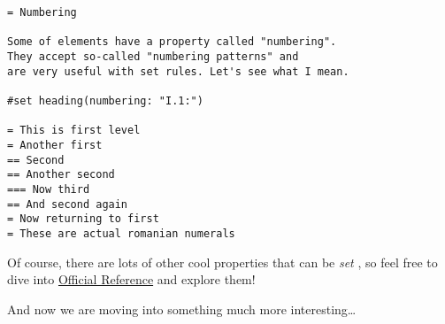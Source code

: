 \begin{verbatim}
= Numbering

Some of elements have a property called "numbering".
They accept so-called "numbering patterns" and
are very useful with set rules. Let's see what I mean.

#set heading(numbering: "I.1:")

= This is first level
= Another first
== Second
== Another second
=== Now third
== And second again
= Now returning to first
= These are actual romanian numerals
\end{verbatim}

\pandocbounded{}

Of course, there are lots of other cool properties that can be
\emph{set} , so feel free to dive into
\href{https://typst.app/docs/reference/}{Official Reference} and explore
them!

And now we are moving into something much more interesting\ldots{}
